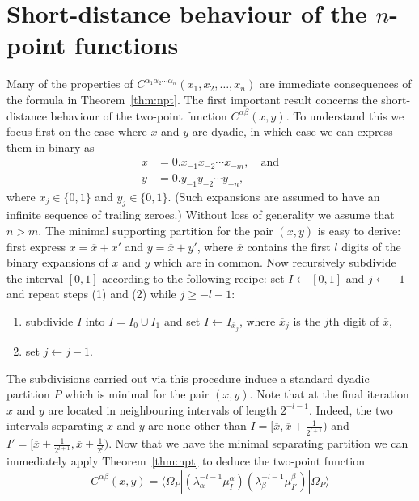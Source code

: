 \documentclass[11pt,oneside]{amsart}
\theoremstyle{plain}%
\theoremstyle{definition}
\theoremstyle{remark}
\begin{document}
\section{\texorpdfstring{Short-distance behaviour of the $n$-point functions}{Short-distance behaviour of the n-point functions}}\label{sec:shortdistance}
Many of the properties of $C^{\alpha_1\alpha_2\cdots\alpha_n}(x_1, x_2, \ldots, x_n)$ are immediate consequences of the formula in Theorem~\ref{thm:npt}. The first important result concerns the short-distance behaviour of the two-point function $C^{\alpha\beta}(x,y)$. To understand this we focus first on the case where $x$ and $y$ are dyadic, in which case we can express them in binary as
\begin{equation}
	\begin{split}
		x &= 0.x_{-1}x_{-2}\cdots x_{-m}, \quad\text{and} \\
		y &= 0.y_{-1}y_{-2}\cdots y_{-n},
	\end{split}
\end{equation}
where $x_j\in\{0,1\}$ and $y_j \in \{0,1\}$. (Such expansions are assumed to have an infinite sequence of trailing zeroes.) Without loss of generality we assume that $n>m$. The minimal supporting partition for the pair $(x,y)$ is easy to derive: first express $x = \overline{x} + x'$ and $y = \overline{x} + y'$, where $\overline{x}$ contains the first $l$ digits of the binary expansions of $x$ and $y$ which are in common. Now recursively subdivide the interval $[0,1]$ according to the following recipe: set $I\leftarrow [0,1]$ and $j\leftarrow -1$ and repeat steps (1) and (2) while $j \ge -l-1$:
\begin{enumerate}
	\item subdivide $I$ into $I=I_0\cup I_1$ and set $I\leftarrow I_{\overline{x}_{j}}$, where $\overline{x}_{j}$ is the $j$th digit of $\overline{x}$,
	\item set $j\leftarrow j-1$.
\end{enumerate}
The subdivisions carried out via this procedure induce a standard dyadic partition $P$ which is minimal for the pair $(x,y)$. Note that at the final iteration $x$ and $y$ are located in neighbouring intervals of length $2^{-l-1}$. Indeed, the two intervals separating $x$ and $y$ are none other than $I = [\overline{x},\overline{x}+\frac{1}{2^{l+1}})$ and $I'=[\overline{x}+\frac{1}{2^{l+1}}, \overline{x}+\frac{1}{2^{l}})$.
Now that we have the minimal separating partition we can immediately apply Theorem~\ref{thm:npt} to deduce the two-point function
\begin{equation}
	C^{\alpha\beta}(x,y) = \langle \Omega_P|(\lambda_\alpha^{-l-1}\mu^\alpha_I)(\lambda_\beta^{-l-1}\mu^\beta_{I'})|\Omega_P\rangle
\end{equation}
\end{document}
